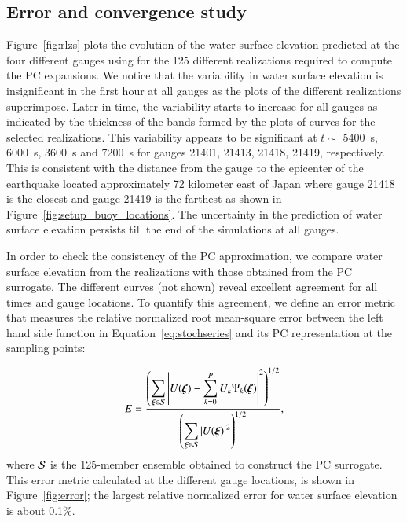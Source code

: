 \subsection{Error and convergence study}
\label{sec:analysis}

 Figure~\ref{fig:rlzs} plots the evolution of the
water surface elevation predicted at the four different gauges 
using \geoclaw for the 125 different realizations 
required to compute the PC expansions. We notice that the 
variability in water surface elevation is insignificant in the first 
hour at all gauges as the plots of the different realizations superimpose.
Later in time, the variability starts to increase for all gauges 
as indicated by the thickness of the bands formed by the plots of curves for the selected realizations.
This variability appears to be significant at $t\sim$ 5400~s, 6000~s, 3600~s and 7200~s
for gauges 21401, 21413, 21418, 21419, respectively.
This is consistent with the distance from the gauge to the epicenter of the earthquake located approximately 72 kilometer east of Japan where gauge 21418 is the closest and gauge 21419 is the farthest as shown in Figure~\ref{fig:setup_buoy_locations}.
The uncertainty in the prediction of water surface  elevation persists till the end of the simulations
at all gauges.

In order to check the consistency of the PC approximation, we compare
water surface elevation from the realizations 
with those obtained from the PC surrogate. The different curves (not shown) 
reveal excellent agreement for all times and gauge locations.
To quantify this agreement, we define
an error metric that measures the relative normalized root mean-square error between the left hand side function 
in Equation~\eqref{eq:stochseries} and its PC representation at the sampling points:

\begin{equation} 
   E = \frac{\displaystyle
         \left(\sum_{\xxi \in \NISP} \left|U(\xxi) - \sum_{k = 0}^{P}
U_k\Psi_k(\xxi)\right|^2
         \right)^{1/2}}
        {\displaystyle
          \left(\sum_{\xxi \in \NISP} \left|U(\xxi)\right|^2\right)^{1/2} 
          },
\label{eq:error}
\end{equation}
where $\mathcal{S}$ is the 125-member ensemble obtained to construct the PC surrogate. 
This error metric calculated at the different gauge locations, is shown in Figure~\ref{fig:error};
the largest relative normalized error for 
water surface elevation is about 0.1\%. 

